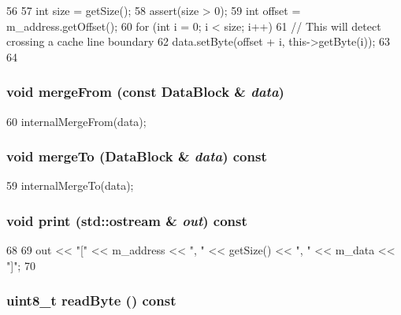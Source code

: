 \begin{DoxyCode}
56 {
57     int size = getSize();
58     assert(size > 0);
59     int offset = m_address.getOffset();
60     for (int i = 0; i < size; i++) {
61         // This will detect crossing a cache line boundary
62         data.setByte(offset + i, this->getByte(i));
63     }
64 }
\end{DoxyCode}
\hypertarget{classSubBlock_acffc0dafa5d2a064a523dff40070ed36}{
\subsubsection[{mergeFrom}]{\setlength{\rightskip}{0pt plus 5cm}void mergeFrom (const {\bf DataBlock} \& {\em data})}}
\label{classSubBlock_acffc0dafa5d2a064a523dff40070ed36}



\begin{DoxyCode}
60 { internalMergeFrom(data); }
\end{DoxyCode}
\hypertarget{classSubBlock_a1be9f3fe77e022deeff58486e2db9e69}{
\subsubsection[{mergeTo}]{\setlength{\rightskip}{0pt plus 5cm}void mergeTo ({\bf DataBlock} \& {\em data}) const}}
\label{classSubBlock_a1be9f3fe77e022deeff58486e2db9e69}



\begin{DoxyCode}
59 { internalMergeTo(data); }
\end{DoxyCode}
\hypertarget{classSubBlock_ac55fe386a101fbae38c716067c9966a0}{
\subsubsection[{print}]{\setlength{\rightskip}{0pt plus 5cm}void print (std::ostream \& {\em out}) const}}
\label{classSubBlock_ac55fe386a101fbae38c716067c9966a0}



\begin{DoxyCode}
68 {
69     out << "[" << m_address << ", " << getSize() << ", " << m_data << "]";
70 }
\end{DoxyCode}
\hypertarget{classSubBlock_a73bc50a98a59ca5140e127763a1a445e}{
\subsubsection[{readByte}]{\setlength{\rightskip}{0pt plus 5cm}uint8\_\-t readByte () const}}
\label{classSubBlock_a73bc50a98a59ca5140e127763a1a445e}



